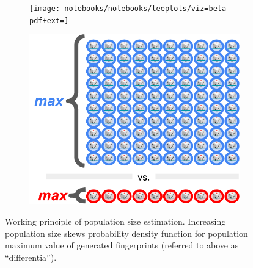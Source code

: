 \begin{figure}
  \centering
  \begin{subfigure}[b]{0.6\textwidth}
    \centering
    \texttt{[image: notebooks/notebooks/teeplots/viz=beta-pdf+ext=]}
  \end{subfigure}%
  \begin{subfigure}[b]{0.4\textwidth}
    \centering
    \includegraphics[width=\textwidth]{img/dice-pool}
    \vspace{3ex}
  \end{subfigure}
  \caption{
    Working principle of population size estimation.
    Increasing population size skews probability density function for population maximum value of generated fingerprints (referred to above as ``differentia'').
  }
  \label{fig:beta-explain}
\end{figure}
